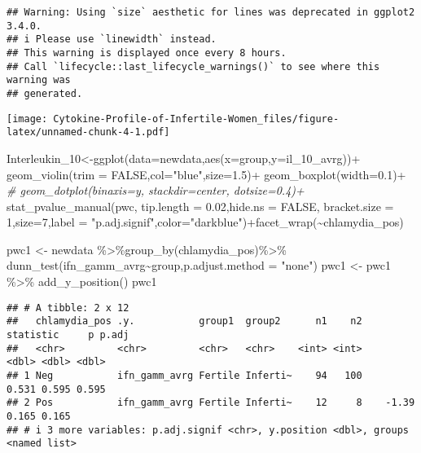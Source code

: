 \documentclass[
]{article}
\newenvironment{Shaded}{\begin{snugshade}}{\end{snugshade}}
\newcommand{\AttributeTok}[1]{\textcolor[rgb]{0.77,0.63,0.00}{#1}}
\newcommand{\CommentTok}[1]{\textcolor[rgb]{0.56,0.35,0.01}{\textit{#1}}}
\newcommand{\ConstantTok}[1]{\textcolor[rgb]{0.00,0.00,0.00}{#1}}
\newcommand{\DecValTok}[1]{\textcolor[rgb]{0.00,0.00,0.81}{#1}}
\newcommand{\FloatTok}[1]{\textcolor[rgb]{0.00,0.00,0.81}{#1}}
\newcommand{\FunctionTok}[1]{\textcolor[rgb]{0.00,0.00,0.00}{#1}}
\newcommand{\NormalTok}[1]{#1}
\newcommand{\OtherTok}[1]{\textcolor[rgb]{0.56,0.35,0.01}{#1}}
\newcommand{\SpecialCharTok}[1]{\textcolor[rgb]{0.00,0.00,0.00}{#1}}
\newcommand{\StringTok}[1]{\textcolor[rgb]{0.31,0.60,0.02}{#1}}
\begin{document}
\begin{verbatim}
## Warning: Using `size` aesthetic for lines was deprecated in ggplot2 3.4.0.
## i Please use `linewidth` instead.
## This warning is displayed once every 8 hours.
## Call `lifecycle::last_lifecycle_warnings()` to see where this warning was
## generated.
\end{verbatim}

\texttt{[image: Cytokine-Profile-of-Infertile-Women\_files/figure-latex/unnamed-chunk-4-1.pdf]}

\begin{Shaded}
\begin{Highlighting}[]
\NormalTok{Interleukin\_10}\OtherTok{\textless{}{-}}\FunctionTok{ggplot}\NormalTok{(}\AttributeTok{data=}\NormalTok{newdata,}\FunctionTok{aes}\NormalTok{(}\AttributeTok{x=}\NormalTok{group,}\AttributeTok{y=}\NormalTok{il\_10\_avrg))}\SpecialCharTok{+}
  \FunctionTok{geom\_violin}\NormalTok{(}\AttributeTok{trim =} \ConstantTok{FALSE}\NormalTok{,}\AttributeTok{col=}\StringTok{"blue"}\NormalTok{,}\AttributeTok{size=}\FloatTok{1.5}\NormalTok{)}\SpecialCharTok{+}
  \FunctionTok{geom\_boxplot}\NormalTok{(}\AttributeTok{width=}\FloatTok{0.1}\NormalTok{)}\SpecialCharTok{+}
  \CommentTok{\# geom\_dotplot(binaxis=\textquotesingle{}y\textquotesingle{}, stackdir=\textquotesingle{}center\textquotesingle{}, dotsize=0.4)+}
  \FunctionTok{stat\_pvalue\_manual}\NormalTok{(pwc, }\AttributeTok{tip.length =} \FloatTok{0.02}\NormalTok{,}\AttributeTok{hide.ns =} \ConstantTok{FALSE}\NormalTok{,}
  \AttributeTok{bracket.size =} \DecValTok{1}\NormalTok{,}\AttributeTok{size=}\DecValTok{7}\NormalTok{,}\AttributeTok{label =} \StringTok{"p.adj.signif"}\NormalTok{,}\AttributeTok{color=}\StringTok{"darkblue"}\NormalTok{)}\SpecialCharTok{+}\FunctionTok{facet\_wrap}\NormalTok{(}\SpecialCharTok{\textasciitilde{}}\NormalTok{chlamydia\_pos)}

\NormalTok{pwc1 }\OtherTok{\textless{}{-}}\NormalTok{ newdata }\SpecialCharTok{\%\textgreater{}\%}\FunctionTok{group\_by}\NormalTok{(chlamydia\_pos)}\SpecialCharTok{\%\textgreater{}\%}
  \FunctionTok{dunn\_test}\NormalTok{(ifn\_gamm\_avrg}\SpecialCharTok{\textasciitilde{}}\NormalTok{group,}\AttributeTok{p.adjust.method =} \StringTok{"none"}\NormalTok{)}
\NormalTok{pwc1 }\OtherTok{\textless{}{-}}\NormalTok{ pwc1 }\SpecialCharTok{\%\textgreater{}\%} \FunctionTok{add\_y\_position}\NormalTok{()}
\NormalTok{pwc1}
\end{Highlighting}
\end{Shaded}

\begin{verbatim}
## # A tibble: 2 x 12
##   chlamydia_pos .y.           group1  group2      n1    n2 statistic     p p.adj
##   <chr>         <chr>         <chr>   <chr>    <int> <int>     <dbl> <dbl> <dbl>
## 1 Neg           ifn_gamm_avrg Fertile Inferti~    94   100     0.531 0.595 0.595
## 2 Pos           ifn_gamm_avrg Fertile Inferti~    12     8    -1.39  0.165 0.165
## # i 3 more variables: p.adj.signif <chr>, y.position <dbl>, groups <named list>
\end{verbatim}
\end{document}
